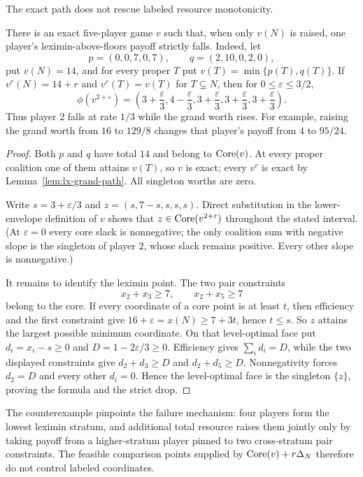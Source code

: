 The exact path does not rescue labeled resource monotonicity.

\begin{theorem}
\label{thm:lx-grand-fails}
There is an exact five-player game $v$ such that, when only $v(N)$ is raised,
one player's leximin-above-floors payoff strictly falls.  Indeed, let
\[
 p=(0,0,7,0,7),\qquad q=(2,10,0,2,0),
\]
put $v(N)=14$, and for every proper $T$ put
$v(T)=\min\{p(T),q(T)\}$.  If $v^r(N)=14+r$ and $v^r(T)=v(T)$ for
$T\subsetneq N$, then for $0\leq\varepsilon\leq3/2$,
\[
 \phi(v^{2+\varepsilon})
 =\left(3+\frac{\varepsilon}{3},
          4-\frac{\varepsilon}{3},
          3+\frac{\varepsilon}{3},
          3+\frac{\varepsilon}{3},
          3+\frac{\varepsilon}{3}\right).
\]
Thus player $2$ falls at rate $1/3$ while the grand worth rises.  For example,
raising the grand worth from $16$ to $129/8$ changes that player's payoff from
$4$ to $95/24$.
\end{theorem}

\begin{proof}
Both $p$ and $q$ have total $14$ and belong to $\operatorname{Core}(v)$.  At every proper
coalition one of them attains $v(T)$, so $v$ is exact; every $v^r$ is exact by
Lemma~\ref{lem:lx-grand-path}.  All singleton worths are zero.

Write $s=3+\varepsilon/3$ and
$z=(s,7-s,s,s,s)$.  Direct substitution in the lower-envelope definition of
$v$ shows that $z\in\operatorname{Core}(v^{2+\varepsilon})$ throughout the stated
interval.  (At $\varepsilon=0$ every core slack is nonnegative; the only
coalition sum with negative slope is the singleton of player $2$, whose slack
remains positive.  Every other slope is nonnegative.)

It remains to identify the leximin point.  The two pair constraints
\[
 x_2+x_3\geq7,\qquad x_2+x_5\geq7
\]
belong to the core.  If every coordinate of a core point is at least $t$, then
efficiency and the first constraint give
$16+\varepsilon=x(N)\geq7+3t$, hence $t\leq s$.
So $z$ attains the largest possible minimum coordinate.  On that
level-optimal face put $d_i=x_i-s\geq0$ and
$D=1-2\varepsilon/3\geq0$.  Efficiency gives $\sum_i d_i=D$, while the two
displayed constraints give $d_2+d_3\geq D$ and $d_2+d_5\geq D$.
Nonnegativity forces $d_2=D$ and every other $d_i=0$.  Hence the
level-optimal face is the singleton $\{z\}$, proving the formula and the
strict drop.
\end{proof}

The counterexample pinpoints the failure mechanism: four players form the
lowest leximin stratum, and additional total resource raises them jointly only
by taking payoff from a higher-stratum player pinned to two cross-stratum pair
constraints.  The feasible comparison points supplied by
$\operatorname{Core}(v)+r\Delta_N$ therefore do not control labeled coordinates.


